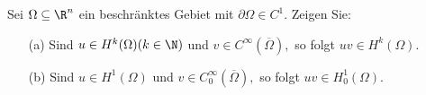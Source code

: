 
\begin{exercise}

  Sei $\Omega \subseteq \R^n$ ein beschränktes Gebiet mit $\partial\Omega \in C^1.$ Zeigen Sie:
  \begin{itemize}
      \item[(a)] Sind $u \in H^k(\Omega) (k \in \N)$ und $v \in C^\infty(\overline{\Omega}),$ so folgt $uv \in H^k(\Omega).$
       \item[(b)] Sind $u \in H^1(\Omega)$ und $v \in C_0^\infty(\overline{\Omega}),$ so folgt $uv \in H^1_0(\Omega).$
  \end{itemize}

\end{exercise}


